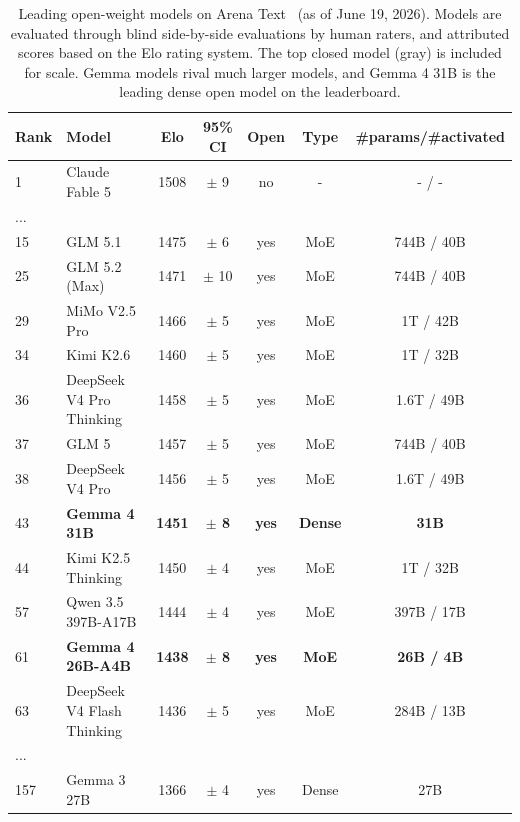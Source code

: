 \documentclass[11pt, a4paper, logo, twocolumn, copyright]{googledeepmind}
\begin{document}
\begin{table}[t]
\centering
\begin{tabular}{@{}llccccc@{}}
\toprule
Rank & Model & Elo   & 95\% CI        & Open       &Type & \#params/\#activated\\
\midrule
\color{gray} 1       & \color{gray} Claude Fable 5       & \color{gray} 1508  & \color{gray} $\pm$ 9 & \color{gray} no & \color{gray} - & \color{gray} - / - \\
...     &       &       &       &       &       & \\
15      & GLM 5.1 \nocite{zeng2026glm}       & 1475  & $\pm$ 6 & yes & MoE & 744B / 40B\\
25      & GLM 5.2 (Max) & 1471  & $\pm$ 10 & yes & MoE & 744B / 40B\\
29      & MiMo V2.5 Pro \nocite{xiao2026mimo} & 1466  & $\pm$ 5 & yes & MoE & 1T / 42B\\
34      & Kimi K2.6 \nocite{team2026kimi}    & 1460  & $\pm$ 5 & yes & MoE & 1T / 32B\\
36      & DeepSeek V4 Pro Thinking \nocite{xu2026deepseek}  & 1458  & $\pm$ 5 & yes & MoE & 1.6T / 49B\\
37      & GLM 5         & 1457  & $\pm$ 5 & yes & MoE & 744B / 40B\\
38      & DeepSeek V4 Pro  & 1456  & $\pm$ 5 & yes & MoE & 1.6T / 49B\\
\color{blue!70!black} 43      & \color{blue!70!black} \textbf{Gemma 4 31B}        & \color{blue!70!black}\textbf{1451}  & \color{blue!70!black} \textbf{$\pm$ 8} & \color{blue!70!black} \textbf{yes} & \color{blue!70!black} \textbf{Dense} & \color{blue!70!black} \textbf{31B}\\
44      & Kimi K2.5 Thinking & 1450  & $\pm$ 4 & yes & MoE & 1T / 32B\\
57      & Qwen 3.5 397B-A17B \nocite{team2026qwen3} & 1444  & $\pm$ 4 & yes & MoE & 397B / 17B\\
\color{blue!70!black} 61      & \color{blue!70!black} \textbf{Gemma 4 26B-A4B}        & \color{blue!70!black}\textbf{1438}  & \color{blue!70!black} \textbf{$\pm$ 8} & \color{blue!70!black} \textbf{yes} & \color{blue!70!black} \textbf{MoE} & \color{blue!70!black} \textbf{26B / 4B}\\
63      & DeepSeek V4 Flash Thinking~~         & 1436  & $\pm$ 5 & yes & MoE & 284B / 13B\\
...     &       &       &       &       &       & \\
157      & Gemma 3 27B         & 1366  & $\pm$ 4 & yes & Dense & 27B\\
\bottomrule
\end{tabular}
\caption{Leading open-weight models on Arena Text~\citep{chiang2024chatbot} (as of June 19, 2026). Models are evaluated through blind side-by-side evaluations by human raters, and attributed scores based on the Elo rating system. The top closed model (gray) is included for scale. Gemma models rival much larger models, and Gemma 4 31B is the leading dense open model on the leaderboard.}
 \label{tab:lmsys_elo_leaderboard}
\end{table}
\end{document}
